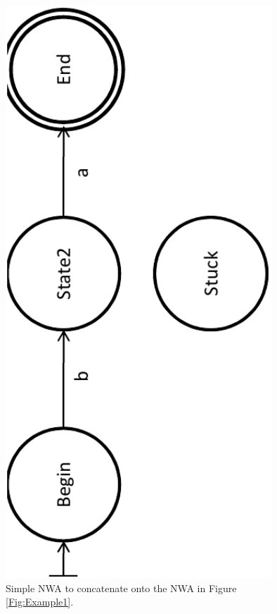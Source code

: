 \documentclass{llncs}
\begin{document}
\begin{figure}[p]
  \centering
    \includegraphics[width=10cm]{Figures/Figure9}
  \caption{Simple NWA to concatenate onto the NWA in Figure \ref{Fig:Example1}.}
  \label{Fig:Concat1}
\end{figure}
\end{document}
